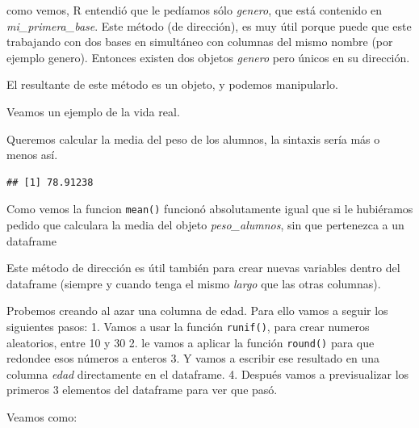 \documentclass[
]{book}
\newenvironment{Shaded}{\begin{snugshade}}{\end{snugshade}}
\newcommand{\AttributeTok}[1]{\textcolor[rgb]{0.77,0.63,0.00}{#1}}
\newcommand{\DecValTok}[1]{\textcolor[rgb]{0.00,0.00,0.81}{#1}}
\newcommand{\FunctionTok}[1]{\textcolor[rgb]{0.00,0.00,0.00}{#1}}
\newcommand{\NormalTok}[1]{#1}
\newcommand{\OtherTok}[1]{\textcolor[rgb]{0.56,0.35,0.01}{#1}}
\newcommand{\SpecialCharTok}[1]{\textcolor[rgb]{0.00,0.00,0.00}{#1}}
\begin{document}
como vemos, R entendió que le pedíamos sólo \emph{genero}, que está contenido en \emph{mi\_primera\_base}.
Este método (de dirección), es muy útil porque puede que este trabajando con dos bases en simultáneo con columnas del mismo nombre (por ejemplo genero). Entonces existen dos objetos \emph{genero} pero únicos en su dirección.

El resultante de este método es un objeto, y podemos manipularlo.

Veamos un ejemplo de la vida real.

Queremos calcular la media del peso de los alumnos, la sintaxis sería más o menos así.

\begin{Shaded}
\end{Shaded}

\begin{verbatim}
## [1] 78.91238
\end{verbatim}

Como vemos la funcion \texttt{mean()} funcionó absolutamente igual que si le hubiéramos pedido que calculara la media del objeto \emph{peso\_alumnos}, sin que pertenezca a un dataframe

Este método de dirección es útil también para crear nuevas variables dentro del dataframe (siempre y cuando tenga el mismo \emph{largo} que las otras columnas).

Probemos creando al azar una columna de edad. Para ello vamos a seguir los siguientes pasos:
1. Vamos a usar la función \texttt{runif()}, para crear numeros aleatorios, entre 10 y 30
2. le vamos a aplicar la función \texttt{round()} para que redondee esos números a enteros
3. Y vamos a escribir ese resultado en una columna \emph{edad} directamente en el dataframe.
4. Después vamos a previsualizar los primeros 3 elementos del dataframe para ver que pasó.

Veamos como:

\begin{Shaded}
\end{Shaded}
\end{document}
